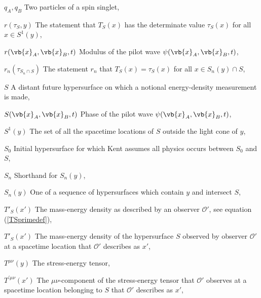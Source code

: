 \begin{thenomenclature}
      \item [{$q_A, q_B$}]\begingroup Two particles of a spin singlet, \nomrefpage{}
      \item [{$r(\tau_S, y)$}]\begingroup The statement that $T_S(x)$ has the determinate value $\tau_S(x)$ for all $x\in S^1(y)$, \nomrefpage{}
      \item [{$r(\vb{x}_A, \vb{x}_B, t)$}]\begingroup Modulus of the pilot wave $\psi(\vb{x}_A, \vb{x}_B, t)$, \nomrefpage{}
      \item [{$r_n(\tau_{S_n\cap S})$}]\begingroup The statement $r_n$  that $T_S(x)=\tau_S(x)$ for all $x\in S_n(y)\cap S$,  \nomrefpage{}
      \item [{$S$}]\begingroup A distant future hypersurface on which a notional energy-density measurement is made, \nomrefpage{}
      \item [{$S(\vb{x}_A, \vb{x}_B,t )$}]\begingroup Phase of the pilot wave $\psi(\vb{x}_A, \vb{x}_B, t)$, \nomrefpage{}
      \item [{$S^1(y)$}]\begingroup The set  of all the spacetime locations of $S$ outside the light cone of $y$, \nomrefpage{}
      \item [{$S_0$}]\begingroup Initial hypersurface for which Kent assumes all physics occurs between $S_0$ and $S$, \nomrefpage{}
      \item [{$S_n$}]\begingroup Shorthand for $S_n(y)$, \nomrefpage{}
      \item [{$S_n(y)$}]\begingroup One of a sequence of hypersurfaces which contain $y$ and intersect $S$, \nomrefpage{}
      \item [{$T'_S(x')$}]\begingroup The mass-energy density as described by an observer $\mathcal{O}'$, see equation (\ref{TSprimedef}), \nomrefpage{}
      \item [{$T'_S(x')$}]\begingroup The mass-energy density of the hypersurface $S$ observed by observer $\mathcal{O}'$ at a spacetime location that $\mathcal{O}'$ describes as $x'$, \nomrefpage{}
      \item [{$T^{\mu\nu}(y)$}]\begingroup The stress-energy tensor, \nomrefpage{}
      \item [{$T^{\prime\mu\nu}(x')$}]\begingroup The $\mu\nu$-component of the stress-energy tensor that $\mathcal{O}'$ observes at a spacetime location  belonging to $S$ that $\mathcal{O}'$ describes as $x'$, \nomrefpage{}

\end{thenomenclature}

